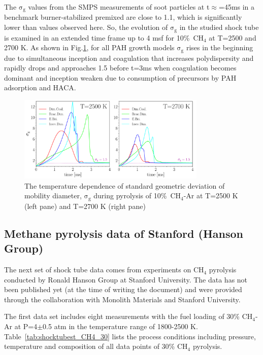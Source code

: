 The $\mathrm{\sigma_{g}}$ values from the SMPS measurements of soot particles at t$\approx$=45ms in a benchmark burner-stabilized premixed are close to 1.1, which is significantly lower than values observed here. So, the evolution of $\mathrm{\sigma_{g}}$ in the studied shock tube is examined in an extended time frame up to 4 msf for 10\%~$\mathrm{CH_4}$ at T=2500 and 2700 K. As shown in Fig.\ref{fig:shocktubesigmatime}, for all PAH growth models $\mathrm{\sigma_{g}}$ rises in the beginning due to simultaneous inception and coagulation that increases polydispersity and rapidly drops and approaches 1.5 before t=3ms when coagulation becomes dominant and inception weaken due to consumption of precursors by PAH adsorption and HACA.


\begin{figure}[H]
	\centering
	\includegraphics[width=0.8\textwidth]{Figures/Results/Shocktube/Agafonov2016/10CH4/sigma_time.pdf}
	\caption{The temperature dependence of standard geometric deviation of mobility diameter, $\mathrm{\sigma_{g}}$ during pyrolysis of 10\%~$\mathrm{CH_4}$-Ar at T=2500 K (left pane) and T=2700 K (right pane)}
	\label{fig:shocktubesigmatime} 
\end{figure}
%
%

\subsection{Methane pyrolysis data of Stanford (Hanson Group)}

The next set of shock tube data comes from experiments on $\mathrm{CH_4}$ pyrolysis conducted by Ronald Hanson Group at Stanford University. The data has not been published yet (at the time of writing the document) and were provided through the collaboration with Monolith Materials and Stanford University.

The first data set includes eight measurements with the fuel loading of 30\% $\mathrm{CH_4}$-Ar at P=4$\pm$0.5 atm in the temperature range of 1800-2500 K. Table~\ref{tab:shocktubest_CH4_30} lists the process conditions including pressure, temperature and composition of all data points of 30\% $\mathrm{CH_4}$ pyrolysis.


